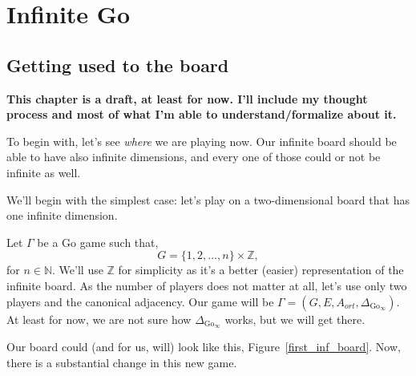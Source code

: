 {\centering
	\chapter{Infinite Go}\label{infgo}}
	
\section{Getting used to the board}
\thispagestyle{empty}
\noindent
{\large\textbf{This chapter is a draft, at least for now. I'll include my thought process and most of what I'm able to understand/formalize about it.}}
\vspace{20pt}

To begin with, let's see \textit{where} we are playing now. Our infinite board should be able to have also infinite dimensions, and every one of those could or not be infinite as well.

We'll begin with the simplest case: let's play on a two-dimensional board that has one infinite dimension.

Let $\Gamma$ be a Go game such that,
$$G=\{1,2,\dots,n\}\times \mathbb{Z},$$
for $n\in \mathbb{N}$. We'll use $\mathbb{Z}$ for simplicity as it's a better (easier) representation of the infinite board.
As the number of players does not matter at all, let's use only two players and the canonical adjacency.
Our game will be $\Gamma=(G,E,A_{ort},\Delta_{\mathrm{Go}_{\infty}})$.
At least for now, we are not sure how $\Delta_{\mathrm{Go}_{\infty}}$ works, but we will get there.

Our board could (and for us, will) look like this, Figure~\ref{first_inf_board}. Now, there is a substantial change in this new game.

